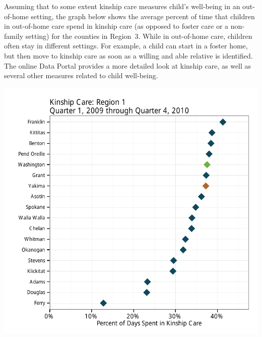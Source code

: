 \documentclass{article}\usepackage[]{graphicx}\usepackage[]{color}
\makeatletter
\def\maxwidth{ %
  \ifdim\Gin@nat@width>\linewidth
    \linewidth
  \else
    \Gin@nat@width
  \fi
}
\newenvironment{knitrout}{}{} %
\makeatother
\begin{document}
Assuming that to some extent kinship care measures child's well-being in an out-of-home setting, the graph below shows the average percent of time that children in out-of-home care spend in kinship care (as opposed to foster care or a non-family setting) for the counties in Region~3. While in out-of-home care, children often stay in different settings. For example, a child can start in a foster home, but then move to kinship care as soon as a willing and able relative is identified. The online Data Portal provides a more detailed look at kinship care, as well as several other measures related to child well-being.


\nopagebreak[3]
\begin{knitrout}
\color{fgcolor}

{\centering \includegraphics[width=\maxwidth]{figure/ooh_wb} 

}



\end{knitrout}
\end{document}
